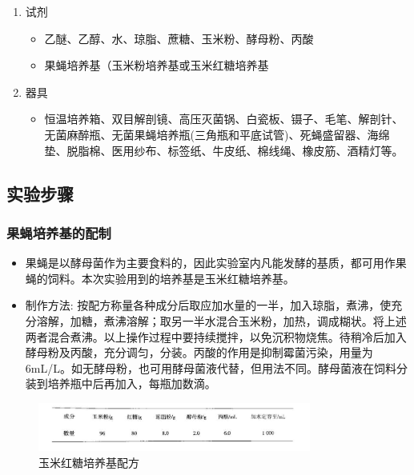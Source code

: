 \documentclass[AutoFakeBold]{LZUThesis}
\begin{document}
\begin{enumerate}
    \item 试剂
    \begin{itemize}
        \item 乙醚、乙醇、水、琼脂、蔗糖、玉米粉、酵母粉、丙酸
        \item 果蝇培养基（玉米粉培养基或玉米红糖培养基
    \end{itemize}

    \item 器具
    \begin{itemize}
        \item 恒温培养箱、双目解剖镜、高压灭菌锅、白瓷板、镊子、毛笔、解剖针、无菌麻醉瓶、无菌果蝇培养瓶(三角瓶和平底试管)、死蝇盛留器、海绵垫、脱脂棉、医用纱布、标签纸、牛皮纸、棉线绳、橡皮筋、酒精灯等。
    \end{itemize}
\end{enumerate}

\subsection{实验步骤}

\subsubsection{果蝇培养基的配制}
\begin{itemize}
    \item 果蝇是以酵母菌作为主要食料的，因此实验室内凡能发酵的基质，都可用作果蝇的饲料。本次实验用到的培养基是玉米红糖培养基。
    \item 制作方法: 按配方称量各种成分后取应加水量的一半，加入琼脂，煮沸，使充分溶解，加糖，煮沸溶解；取另一半水混合玉米粉，加热，调成糊状。将上述两者混合煮沸。以上操作过程中要持续搅拌，以免沉积物烧焦。待稍冷后加入酵母粉及丙酸，充分调匀，分装。丙酸的作用是抑制霉菌污染，用量为6mL/L。如无酵母粉，也可用酵母菌液代替，但用法不同。酵母菌液在饲料分装到培养瓶中后再加入，每瓶加数滴。
\end{itemize}
\begin{figure}[htbp]
    \centering
    \includegraphics[width=0.8\textwidth]{img/medium}
    \caption{玉米红糖培养基配方\cite{niu2018}}
    \label{fig:medium}
\end{figure}
\end{document}
